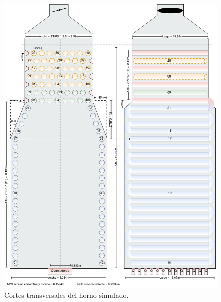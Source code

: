 \begin{figure}[H]
\begin{center}
\includegraphics[scale=0.4]{images/diagrama-vista}
\caption[Cortes transversales del horno]{Cortes transversales del horno simulado.}
\label{fig:diagrama-vista}
\end{center}
\end{figure}

